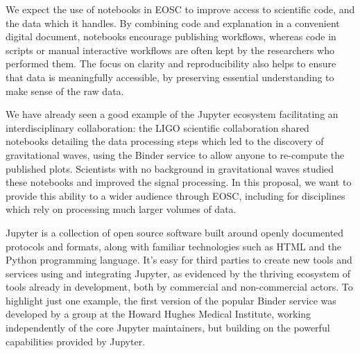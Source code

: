 
We expect the use of notebooks in EOSC to improve access to scientific code,
and the data which it handles. By combining code and explanation in a convenient
digital document, notebooks encourage publishing workflows, whereas code in
scripts or manual interactive workflows are often kept by the researchers who
performed them. The focus on clarity and reproducibility also helps to ensure
that data is meaningfully accessible, by preserving essential understanding to
make sense of the raw data.

We have already seen a good example of the Jupyter ecosystem facilitating an
interdisciplinary collaboration: the LIGO scientific collaboration shared
notebooks detailing the data processing steps which led to the discovery of
gravitational waves, using the Binder service to allow anyone to re-compute
the published plots. Scientists with no background in gravitational waves
studied these notebooks and improved the signal processing.
In this proposal, we want to provide this ability to a wider audience through
EOSC, including for disciplines which rely on processing much larger volumes of
data.



Jupyter is a collection of open source software built around openly documented
protocols and formats, along with familiar technologies such as HTML and the
Python programming language. It's easy for third parties to create new
tools and services using and integrating Jupyter, as evidenced by the thriving
ecosystem of tools already in development, both by commercial and non-commercial
actors. To highlight just one example, the first version of the popular Binder
service was developed by a group at the Howard Hughes Medical Institute,
working independently of the core Jupyter maintainers, but building on the
powerful capabilities provided by Jupyter.

